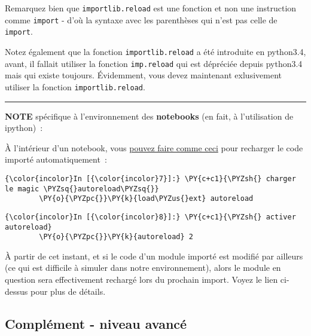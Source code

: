     Remarquez bien que \texttt{importlib.reload} est une fonction et non une
instruction comme \texttt{import} - d'où la syntaxe avec les parenthèses
qui n'est pas celle de \texttt{import}.

Notez également que la fonction \texttt{importlib.reload} a été
introduite en python3.4, avant, il fallait utiliser la fonction
\texttt{imp.reload} qui est dépréciée depuis python3.4 mais qui existe
toujours. Évidemment, vous devez maintenant exlusivement utiliser la
fonction \texttt{importlib.reload}.

    \begin{center}\rule{0.5\linewidth}{\linethickness}\end{center}

    \textbf{NOTE} spécifique à l'environnement des \textbf{notebooks} (en
fait, à l'utilisation de ipython)~:

À l'intérieur d'un notebook, vous
\href{https://ipython.org/ipython-doc/3/config/extensions/autoreload.html}{pouvez
faire comme ceci} pour recharger le code importé automatiquement~:

    \begin{Verbatim}[commandchars=\\\{\},frame=single,framerule=0.3mm,rulecolor=\color{cellframecolor}]
{\color{incolor}In [{\color{incolor}7}]:} \PY{c+c1}{\PYZsh{} charger le magic \PYZsq{}autoreload\PYZsq{}}
        \PY{o}{\PYZpc{}}\PY{k}{load\PYZus{}ext} autoreload
\end{Verbatim}


    \begin{Verbatim}[commandchars=\\\{\},frame=single,framerule=0.3mm,rulecolor=\color{cellframecolor}]
{\color{incolor}In [{\color{incolor}8}]:} \PY{c+c1}{\PYZsh{} activer autoreload}
        \PY{o}{\PYZpc{}}\PY{k}{autoreload} 2
\end{Verbatim}


    À partir de cet instant, et si le code d'un module importé est modifié
par ailleurs (ce qui est difficile à simuler dans notre environnement),
alors le module en question sera effectivement rechargé lors du prochain
import. Voyez le lien ci-dessus pour plus de détails.

    \hypertarget{compluxe9ment---niveau-avancuxe9}{%
\subsection{Complément - niveau
avancé}\label{compluxe9ment---niveau-avancuxe9}}

